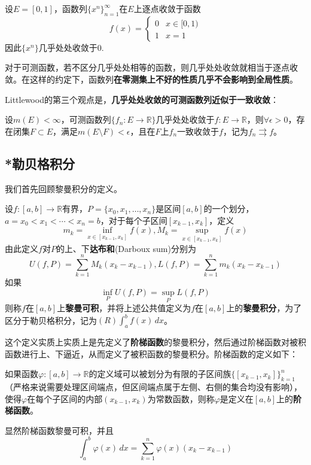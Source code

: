 \documentclass{ctexbook}
\begin{document}
\begin{example}
    设$E=[0,1]$，函数列$\{x^n\}_{n=1}^{\infty}$在$E$上逐点收敛于函数
\[f(x)=
\begin{cases}
0 & x\in [0,1)    \\
1 & x=1
\end{cases}\]
因此$\{x^n\}$几乎处处收敛于0.
\end{example}

对于可测函数，若不区分几乎处处相等的函数，则几乎处处收敛就相当于逐点收敛。在这样的约定下，函数列\textbf{在零测集上不好的性质几乎不会影响到全局性质}。

Littlewood的第三个观点是，\textbf{几乎处处收敛的可测函数列近似于一致收敛}：

\begin{theorem}[Egoroff定理]
    设$m(E)<\infty$，可测函数列$\{f_n:E\to\mathbb{R}\}$几乎处处收敛于$f:E\to\mathbb{R}$，则$\forall \epsilon>0$，存在闭集$F\subset E$，满足$m(E\setminus F)<\epsilon$，且在$F$上$f_n$一致收敛于$f$，记为$f_n\rightrightarrows f$。
\end{theorem}

\subsection{*勒贝格积分}\label{sub:integral}

我们首先回顾黎曼积分的定义。

\begin{definition}[黎曼积分]
    设$f:[a,b]\to\mathbb{R}$有界，$P=\{x_0,x_1,\dots,x_n\}$是区间$[a,b]$的一个划分，$a=x_0<x_1<\cdots <x_n=b$，对于每个子区间$[x_{k-1},x_k]$，定义
    \[m_k=\inf_{x\in [x_{k-1},x_k]}f(x),M_k=\sup_{x\in [x_{k-1},x_k]}f(x)\]
    由此定义$f$对$P$的上、下\textbf{达布和}(Darboux sum)分别为
    \[U(f,P)=\sum_{k=1}^{n}M_k(x_k-x_{k-1}),L(f,P)=\sum_{k=1}^{n}m_k(x_k-x_{k-1})\]
    如果
    \[\inf_{P}U(f,P)=\sup_{P}L(f,P)\]
    则称$f$在$[a,b]$上\textbf{黎曼可积}，并将上述公共值定义为$f$在$[a,b]$上的\textbf{黎曼积分}，为了区分于勒贝格积分，记为$(R)\int_{a}^{b}f(x)\,dx$。
\end{definition}

这个定义实质上实质上是先定义了\textbf{阶梯函数}的黎曼积分，然后通过阶梯函数对被积函数进行上、下逼近，从而定义了被积函数的黎曼积分。阶梯函数的定义如下：

\begin{definition}[阶梯函数]
    如果函数$\varphi:[a,b]\to\mathbb{R}$的定义域可以被划分为有限的子区间族$\{[x_{k-1},x_k]\}_{k=1}^{n}$（严格来说需要处理区间端点，但区间端点属于左侧、右侧的集合均没有影响），使得$\varphi$在每个子区间的内部$(x_{k-1},x_k)$为常数函数，则称$\varphi$是定义在$[a,b]$上的\textbf{阶梯函数}。

    显然阶梯函数黎曼可积，并且
    $$\int_{a}^{b}\varphi(x)\,dx=\sum_{k=1}^{n}\varphi(x)(x_k-x_{k-1})$$
\end{definition}
\end{document}
